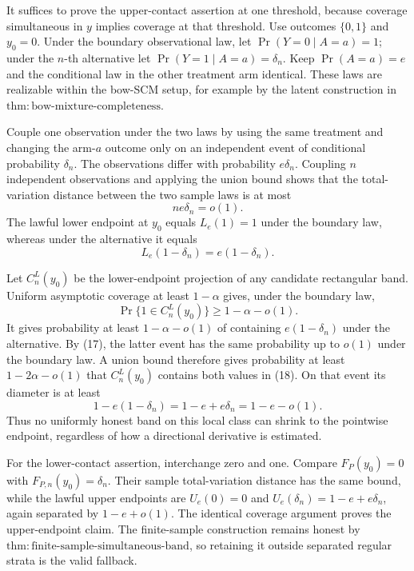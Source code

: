 It suffices to prove the upper-contact assertion at one threshold, because coverage simultaneous in \(y\) implies coverage at that threshold.  Use outcomes \(\{0,1\}\) and \(y_0=0\).  Under the boundary observational law, let \(\Pr(Y=0\mid A=a)=1\); under the \(n\)-th alternative let \(\Pr(Y=1\mid A=a)=\delta_n\).  Keep \(\Pr(A=a)=e\) and the conditional law in the other treatment arm identical.  These laws are realizable within the bow-SCM setup, for example by the latent construction in \(\mathrm{thm:bow\text{-}mixture\text{-}completeness}\).

Couple one observation under the two laws by using the same treatment and changing the arm-\(a\) outcome only on an independent event of conditional probability \(\delta_n\).  The observations differ with probability \(e\delta_n\).  Coupling \(n\) independent observations and applying the union bound shows that the total-variation distance between the two sample laws is at most
\[
 ne\delta_n=o(1). \tag{17}
\]
The lawful lower endpoint at \(y_0\) equals \(L_e(1)=1\) under the boundary law, whereas under the alternative it equals
\[
 L_e(1-\delta_n)=e(1-\delta_n). \tag{18}
\]

Let \(C_n^L(y_0)\) be the lower-endpoint projection of any candidate rectangular band.  Uniform asymptotic coverage at least \(1-\alpha\) gives, under the boundary law,
\[
 \Pr\{1\in C_n^L(y_0)\}\ge1-\alpha-o(1).
\]
It gives probability at least \(1-\alpha-o(1)\) of containing \(e(1-\delta_n)\) under the alternative.  By (17), the latter event has the same probability up to \(o(1)\) under the boundary law.  A union bound therefore gives probability at least \(1-2\alpha-o(1)\) that \(C_n^L(y_0)\) contains both values in (18).  On that event its diameter is at least
\[
 1-e(1-\delta_n)=1-e+e\delta_n=1-e-o(1).
\]
Thus no uniformly honest band on this local class can shrink to the pointwise endpoint, regardless of how a directional derivative is estimated.

For the lower-contact assertion, interchange zero and one.  Compare \(F_P(y_0)=0\) with \(F_{P,n}(y_0)=\delta_n\).  Their sample total-variation distance has the same bound, while the lawful upper endpoints are \(U_e(0)=0\) and \(U_e(\delta_n)=1-e+e\delta_n\), again separated by \(1-e+o(1)\).  The identical coverage argument proves the upper-endpoint claim.  The finite-sample construction remains honest by \(\mathrm{thm:finite\text{-}sample\text{-}simultaneous\text{-}band}\), so retaining it outside separated regular strata is the valid fallback.